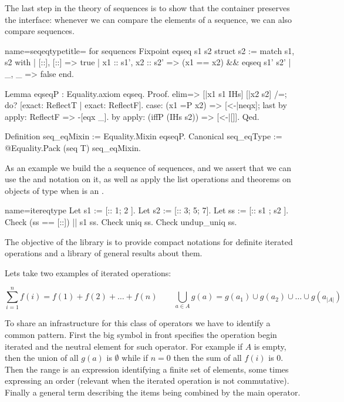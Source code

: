 The last step in the theory of sequences is to show that the container
preserves the  interface: whenever we can compare the
elements of a sequence, we can also compare sequences.

\begin{coq}{name=seqeqtype}{title= for sequences}
Fixpoint eqseq s1 s2 {struct s2} :=
  match s1, s2 with
  | [::], [::] => true
  | x1 :: s1', x2 :: s2' => (x1 == x2) && eqseq s1' s2'
  | _, _ => false
  end.

Lemma eqseqP : Equality.axiom eqseq.
Proof.
elim=> [|x1 s1 IHs] [|x2 s2] /=; do? [exact: ReflectT | exact: ReflectF].
case: (x1 =P x2) => [<-|neqx]; last by apply: ReflectF => -[eqx _].
by apply: (iffP (IHs s2)) => [<-|[]].
Qed.

Definition seq_eqMixin := Equality.Mixin eqseqP.
Canonical seq_eqType := @Equality.Pack (seq T) seq_eqMixin.
\end{coq}

As an example we build the a sequence of sequences, and we assert that
we can use the \C{==} and \C{\\in} notation on it, as well as apply
the list operations and theorems on objects of type 
when  is an .

\begin{coq}{name=itereqtype}{}
Let s1 := [:: 1; 2 ].
Let s2 := [:: 3; 5; 7].
Let ss := [:: s1 ; s2 ].
Check (ss == [::]) || s1 \in ss.
Check uniq ss.
Check undup_uniq ss.
\end{coq}


The objective of the  library is to provide compact notations 
for definite iterated operations and a library of general results about them.

Lets take two examples of iterated operations:

$$
\sum_{i=1}^n f(i) = f(1) + f(2) + \ldots + f(n)
\qquad \bigcup_{a \in A} g(a) = g(a_1) \cup g(a_2) \cup \ldots \cup g(a_{|A|})
$$

To share an infrastructure for this class of operators we have to
identify a common pattern.  First the big symbol in front specifies the
operation begin iterated and the neutral element for such operator.
For example if $A$ is empty, then the union of all $g(a)$ is $\emptyset$
while if $n=0$ then the sum of all $f(i)$ is $0$.
Then the range is an expression identifying a finite set of elements,
some times expressing an order (relevant when the iterated operation is not
commutative).  Finally a general term describing the
items being combined by the main operator.


